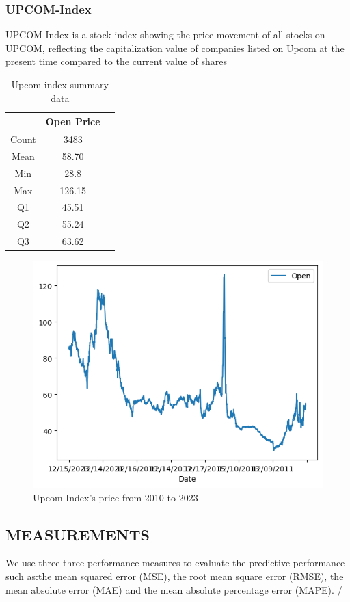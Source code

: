 \documentclass{ieeeojies}
\begin{document}
\subsubsection{UPCOM-Index}
UPCOM-Index is a stock index showing the price movement of all stocks on UPCOM, reflecting the capitalization value of companies listed on Upcom at the present time compared to the current value of shares \cite{e5}
\begin{table}[H]
    \centering
    \begin{tabular}{|c|c|c|}
        \hline
          &  Open Price  \\
        \hline
        Count & 3483  \\
        \hline
        Mean & 58.70  \\
        \hline
        Min & 28.8 \\
        \hline
        Max &  126.15\\
        \hline
        Q1 & 45.51\\
        \hline
        Q2 &  55.24\\
        \hline
        Q3 &  63.62\\
        \hline
    \end{tabular}
    \caption{Upcom-index summary data}
    \label{table:example}
\end{table}
\begin{figure}[H]
    \centering
    \includegraphics[width=0.8\linewidth]{UPC.PNG}
    \caption{Upcom-Index's price from 2010 to 2023}
    \label{fig:example}
\end{figure}

\subsection{MEASUREMENTS}
We use three three performance measures to evaluate the predictive performance such as:the mean squared error (MSE), the root mean square error (RMSE), the mean absolute error (MAE) and the mean absolute percentage error (MAPE). /\cite{e1}
\end{document}
